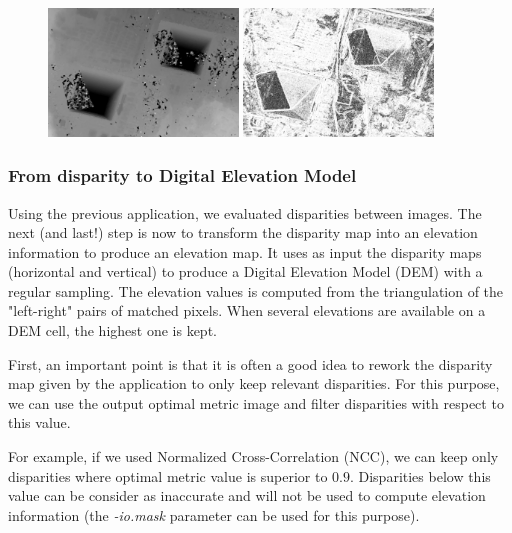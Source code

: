\begin{figure}[!h]
  \center
  \includegraphics[width=0.45\textwidth]{../Art/MonteverdiImages/stereo_disparity_horizontal.png}
  \includegraphics[width=0.45\textwidth]{../Art/MonteverdiImages/stereo_disparity_metric.png}
  \label{fig:DisparityMetric}
\end{figure}

\subsubsection{From disparity to Digital Elevation Model}

Using the previous application, we evaluated disparities between images. The
next (and last!) step is now to transform the disparity map into an elevation
information to produce an elevation map. It uses as input the disparity maps
(horizontal and vertical) to produce a Digital Elevation Model (DEM) with a
regular sampling. The elevation values is computed from the triangulation of the
"left-right" pairs of matched pixels. When several elevations are available on
a DEM cell, the highest one is kept.

First, an important point is that it is often a good idea to rework
the disparity map given by the  application
to only keep relevant disparities. For this purpose, we can use the
output optimal metric image and filter disparities with respect to this
value.

For example, if we used Normalized Cross-Correlation (NCC), we can
keep only disparities where optimal metric value is superior to
$0.9$. Disparities below this value can be consider as inaccurate and
will not be used to compute elevation information
(the \textit{-io.mask} parameter can be used for this purpose).

